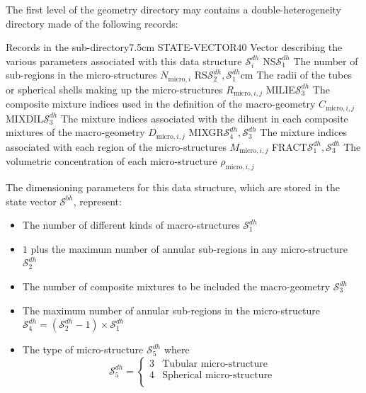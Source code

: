 The first level of the geometry directory may contains a double-heterogeneity directory  made of the
following records:

\begin{DescriptionEnregistrement}{Records in the  sub-directory}{7.5cm}
\IntEnr
  {STATE-VECTOR}{$40$}
  {Vector describing the various parameters associated with this data structure $\mathcal{S}^{dh}_{i}$}
\IntEnr
  {NS}{$\mathcal{S}^{dh}_{1}$}
  {The number of sub-regions in the micro-structures $N_{\mathrm{micro},i}$} 
\RealEnr
  {RS}{$\mathcal{S}^{dh}_{2},\mathcal{S}^{dh}_{1}$}{cm}
  {The radii of the tubes or spherical shells making up the micro-structures
   $R_{\mathrm{micro},i,j}$}
\IntEnr
  {MILIE}{$\mathcal{S}^{dh}_{3}$}
  {The composite mixture indices used in the definition of the macro-geometry $C_{\mathrm{micro},i,j}$}
\IntEnr
  {MIXDIL}{$\mathcal{S}^{dh}_{3}$}
  {The mixture indices associated with the diluent in each composite mixtures of the macro-geometry $D_{\mathrm{micro},i,j}$}
\IntEnr
  {MIXGR}{$\mathcal{S}^{dh}_{4},\mathcal{S}^{dh}_{3}$}
  {The mixture indices associated with each region of the micro-structures $M_{\mathrm{micro},i,j}$}
\RealEnr
  {FRACT}{$\mathcal{S}^{dh}_{1},\mathcal{S}^{dh}_{3}$}{}
  {The volumetric concentration of each micro-structure $\rho_{\mathrm{micro},i,j}$}
\end{DescriptionEnregistrement}

The dimensioning parameters for this data structure, which are stored in the state vector
$\mathcal{S}^{bh}$, represent:

\begin{itemize}

\item The number of different kinds of macro-structures $\mathcal{S}^{dh}_{1}$ 

\item $1$ plus the maximum number of annular sub-regions in any micro-structure
$\mathcal{S}^{dh}_{2}$ 

\item The number of composite mixtures to be included the macro-geometry $\mathcal{S}^{dh}_{3}$ 

\item The maximum number of annular sub-regions in the micro-structure 
$\mathcal{S}^{dh}_{4}=(\mathcal{S}^{dh}_{2}-1)\times \mathcal{S}^{dh}_{1}$ 

\item The type of micro-structure $\mathcal{S}^{dh}_{5}$
\noindent where
\begin{displaymath}
\mathcal{S}^{dh}_{5} = \left\{
\begin{array}{rl}
 3 & \textrm{Tubular micro-structure} \\
 4 & \textrm{Spherical micro-structure} \\
\end{array} \right.
\end{displaymath}
\end{itemize}

